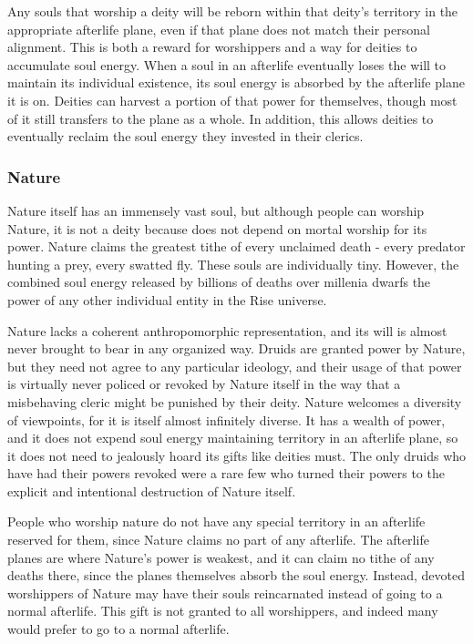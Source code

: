             Any souls that worship a deity will be reborn within that deity's territory in the appropriate afterlife plane, even if that plane does not match their personal alignment.
            This is both a reward for worshippers and a way for deities to accumulate soul energy.
            When a soul in an afterlife eventually loses the will to maintain its individual existence, its soul energy is absorbed by the afterlife plane it is on.
            Deities can harvest a portion of that power for themselves, though most of it still transfers to the plane as a whole.
            In addition, this allows deities to eventually reclaim the soul energy they invested in their clerics.

        \subsubsection{Nature}
            Nature itself has an immensely vast soul, but although people can worship Nature, it is not a deity because does not depend on mortal worship for its power.
            Nature claims the greatest tithe of every unclaimed death - every predator hunting a prey, every swatted fly.
            These souls are individually tiny.
            However, the combined soul energy released by billions of deaths over millenia dwarfs the power of any other individual entity in the Rise universe.

            Nature lacks a coherent anthropomorphic representation, and its will is almost never brought to bear in any organized way.
            Druids are granted power by Nature, but they need not agree to any particular ideology, and their usage of that power is virtually never policed or revoked by Nature itself in the way that a misbehaving cleric might be punished by their deity.
            Nature welcomes a diversity of viewpoints, for it is itself almost infinitely diverse.
            It has a wealth of power, and it does not expend soul energy maintaining territory in an afterlife plane, so it does not need to jealously hoard its gifts like deities must.
            The only druids who have had their powers revoked were a rare few who turned their powers to the explicit and intentional destruction of Nature itself.

            People who worship nature do not have any special territory in an afterlife reserved for them, since Nature claims no part of any afterlife.
            The afterlife planes are where Nature's power is weakest, and it can claim no tithe of any deaths there, since the planes themselves absorb the soul energy.
            Instead, devoted worshippers of Nature may have their souls reincarnated instead of going to a normal afterlife.
            This gift is not granted to all worshippers, and indeed many would prefer to go to a normal afterlife.

